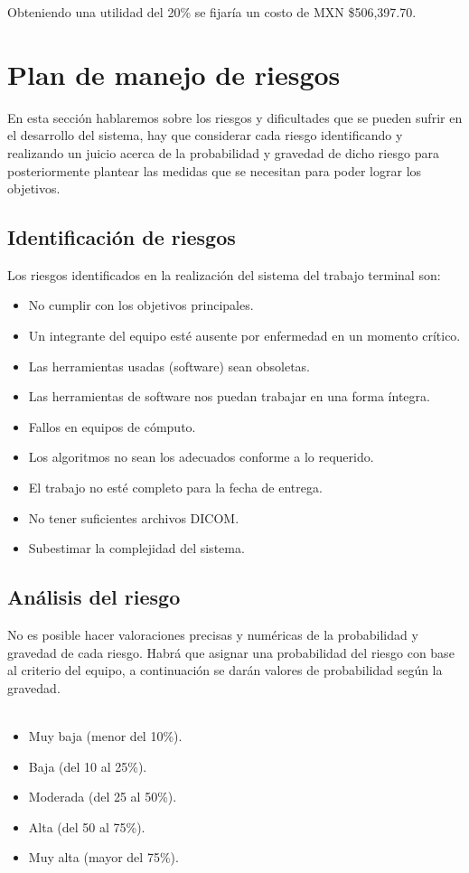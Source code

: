 \documentclass[12pt]{report}
\begin{document}
Obteniendo una utilidad del 20\% se fijaría un costo de MXN \$506,397.70.


\section{Plan de manejo de riesgos}
En esta sección hablaremos sobre los riesgos y dificultades que se pueden sufrir en el desarrollo del sistema, hay que considerar cada riesgo identificando y realizando un juicio acerca de la probabilidad y gravedad de dicho riesgo para posteriormente plantear las medidas que se necesitan para poder lograr los objetivos.\\

\subsection{Identificación de riesgos}
Los riesgos identificados en la realización del sistema del trabajo terminal son:
\begin{itemize}
\item No cumplir con los objetivos principales.
\item Un integrante del equipo esté ausente por enfermedad en un momento crítico.
\item Las herramientas usadas (software) sean obsoletas.
\item Las herramientas de software nos puedan trabajar en una forma íntegra.
\item Fallos en equipos de cómputo.
\item Los algoritmos no sean los adecuados conforme a lo requerido.
\item El trabajo no esté completo para la fecha de entrega.
\item No tener suficientes archivos DICOM.
\item Subestimar la complejidad del sistema.
\end{itemize}

\subsection{Análisis del riesgo}
No es posible hacer valoraciones precisas y numéricas de la probabilidad y gravedad de cada riesgo. Habrá que asignar una probabilidad del riesgo con base al criterio del equipo, a continuación se darán valores de probabilidad según la gravedad.\\\\
\begin{itemize}
\item Muy baja (menor del 10\%).
\item Baja (del 10 al 25\%).
\item Moderada (del 25 al 50\%).
\item Alta (del 50 al 75\%).
\item Muy alta (mayor del 75\%).
\end{itemize}
\end{document}
